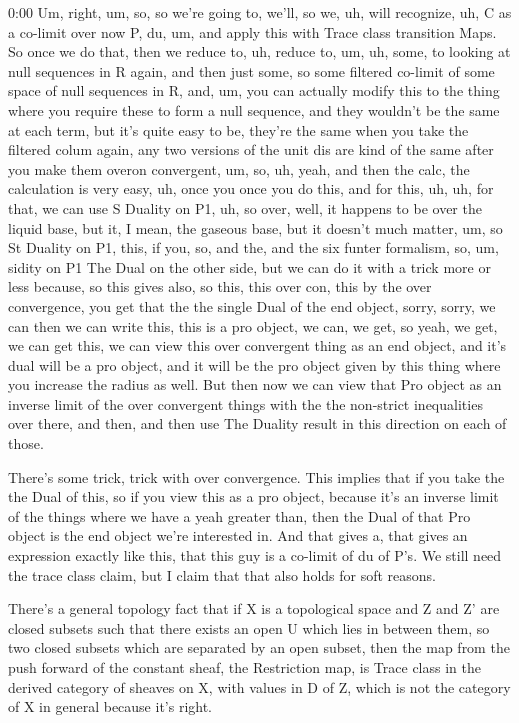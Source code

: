 \begin{unfinished}{0:00}
Um, right, um, so, so we're going to, we'll, so we, uh, will recognize, uh, C as a co-limit over now P, du, um, and apply this with Trace class transition Maps. So once we do that, then we reduce to, uh, reduce to, um, uh, some, to looking at null sequences in R again, and then just some, so some filtered co-limit of some space of null sequences in R, and, um, you can actually modify this to the thing where you require these to form a null sequence, and they wouldn't be the same at each term, but it's quite easy to be, they're the same when you take the filtered colum again, any two versions of the unit dis are kind of the same after you make them overon convergent, um, so, uh, yeah, and then the calc, the calculation is very easy, uh, once you once you do this, and for this, uh, uh, for that, we can use S Duality on P1, uh, so over, well, it happens to be over the liquid base, but it, I mean, the gaseous base, but it doesn't much matter, um, so St Duality on P1, this, if you, so, and the, and the six funter formalism, so, um, sidity on P1
The Dual on the other side, but we can do it with a trick more or less because, so this gives also, so this, this over con, this by the over convergence, you get that the the single Dual of the end object, sorry, sorry, we can then we can write this, this is a pro object, we can, we get, so yeah, we get, we can get this, we can view this over convergent thing as an end object, and it's dual will be a pro object, and it will be the pro object given by this thing where you increase the radius as well. But then now we can view that Pro object as an inverse limit of the over convergent things with the the non-strict inequalities over there, and then, and then use The Duality result in this direction on each of those.

There's some trick, trick with over convergence. This implies that if you take the the Dual of this, so if you view this as a pro object, because it's an inverse limit of the things where we have a yeah greater than, then the Dual of that Pro object is the end object we're interested in. And that gives a, that gives an expression exactly like this, that this guy is a co-limit of du of P's. We still need the trace class claim, but I claim that that also holds for soft reasons.

There's a general topology fact that if X is a topological space and Z and Z' are closed subsets such that there exists an open U which lies in between them, so two closed subsets which are separated by an open subset, then the map from the push forward of the constant sheaf, the Restriction map, is Trace class in the derived category of sheaves on X, with values in D of Z, which is not the category of X in general because it's right.


\end{unfinished}
